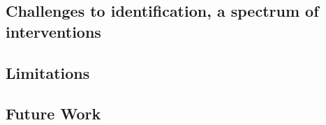 \subsection{Challenges to identification, a spectrum of interventions}
\subsection{Limitations}
\subsection{Future Work}